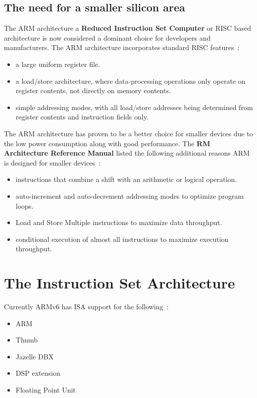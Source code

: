 \documentclass[11pt]{report}
\begin{document}
\subsection{The need for a smaller silicon area}
\begin{doublespace}
The ARM architecture a \textbf{Reduced Instruction Set Computer} or RISC based architecture is now considered a dominant choice for developers and manufacturers. The ARM architecture incorporates standard RISC features~\citep[A1-2]{referenceB}:
\end{doublespace}

\begin{itemize}
\item a large uniform register file.
\item a load/store architecture, where data-processing operations only operate on register contents, not directly on memory contents.
\item simple addressing modes, with all load/store addresses being determined from register contents and instruction fields only.
\end{itemize}
\begin{doublespace}
The ARM architecture has proven to be a better choice for smaller devices due to the low power consumption along with good performance. The \textbf{RM Architecture Reference Manual} listed the following additional reasons ARM is designed for smaller devices~\citep[A1-2]{referenceB}:
\end{doublespace}
\begin{itemize}
\item instructions that combine a shift with an arithmetic or logical operation.
\item auto-increment and auto-decrement addressing modes to optimize program loops.
\item Load and Store Multiple instructions to maximize data throughput.
\item conditional execution of almost all instructions to maximize execution throughput.
\end{itemize}
\section{The Instruction Set Architecture}
Currently ARMv6 has ISA support for the following~\citep{ARM1176}:
\begin{itemize}
\item ARM
\item Thumb\textregistered
\item Jazelle DBX\textregistered
\item DSP extension
\item Floating Point Unit
\end{itemize}
\end{document}

